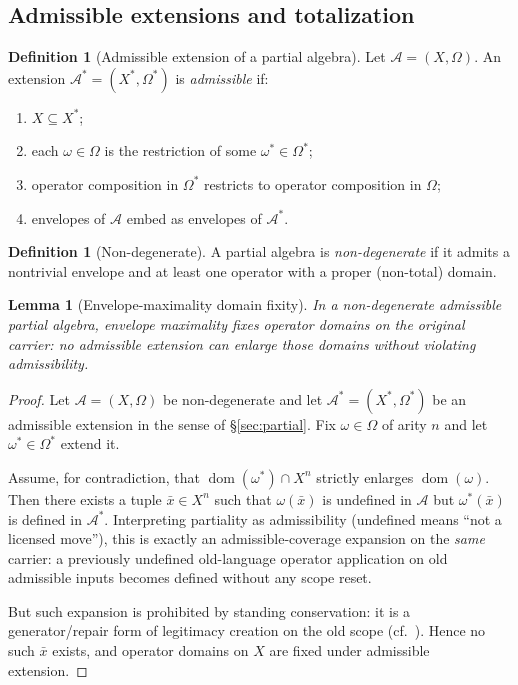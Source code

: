 \documentclass[11pt]{article}
\newtheorem{lemma}[theorem]{Lemma}
\theoremstyle{definition}
\newtheorem{definition}[theorem]{Definition}
\newcommand{\pdom}{\operatorname{dom}}
\begin{document}
\subsection{Admissible extensions and totalization}

\begin{definition}[Admissible extension of a partial algebra]
Let $\mathcal{A}=(X,\Omega)$.
An extension $\mathcal{A}^*=(X^*,\Omega^*)$ is \emph{admissible} if:
\begin{enumerate}[label=(\alph*), leftmargin=2em]
\item $X\subseteq X^*$;
\item each $\omega\in\Omega$ is the restriction of some $\omega^*\in\Omega^*$;
\item operator composition in $\Omega^*$ restricts to operator composition in $\Omega$;
\item envelopes of $\mathcal{A}$ embed as envelopes of $\mathcal{A}^*$.
\end{enumerate}
\end{definition}

\begin{definition}[Non-degenerate]
A partial algebra is \emph{non-degenerate} if it admits a nontrivial envelope and at least one operator with a proper (non-total) domain.
\end{definition}

\begin{lemma}[Envelope-maximality domain fixity]
\label{lem:domain-fixity}
In a non-degenerate admissible partial algebra, envelope maximality fixes operator domains on the original carrier: no admissible extension can enlarge those domains without violating admissibility.
\end{lemma}

\begin{proof}
Let $\mathcal{A}=(X,\Omega)$ be non-degenerate and let $\mathcal{A}^*=(X^*,\Omega^*)$ be an admissible extension in the sense of \S\ref{sec:partial}.
Fix $\omega\in\Omega$ of arity $n$ and let $\omega^*\in\Omega^*$ extend it.

Assume, for contradiction, that $\pdom(\omega^*)\cap X^n$ strictly enlarges $\pdom(\omega)$.
Then there exists a tuple $\bar x\in X^n$ such that $\omega(\bar x)$ is undefined in $\mathcal{A}$ but $\omega^*(\bar x)$ is defined in $\mathcal{A}^*$.
Interpreting partiality as admissibility (undefined means ``not a licensed move''), this is exactly an admissible-coverage expansion on the \emph{same} carrier: a previously undefined old-language operator application on old admissible inputs becomes defined without any scope reset.

But such expansion is prohibited by standing conservation: it is a generator/repair form of legitimacy creation on the old scope (cf.\ ).
Hence no such $\bar x$ exists, and operator domains on $X$ are fixed under admissible extension.
\end{proof}
\end{document}
